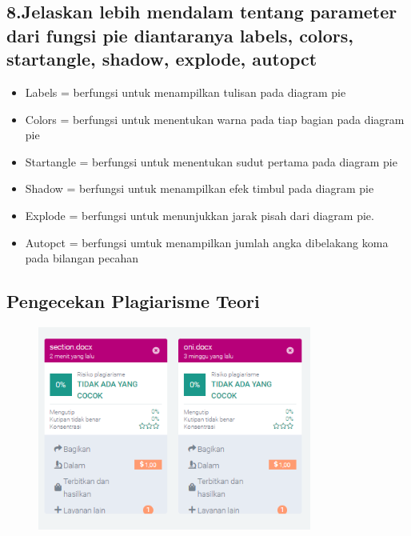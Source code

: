 \subsection{8.Jelaskan lebih mendalam tentang parameter dari fungsi pie diantaranya labels, colors, startangle, shadow, explode, autopct}
\begin{itemize}
\item Labels = berfungsi untuk menampilkan tulisan pada diagram pie
\item Colors = berfungsi untuk menentukan warna pada tiap bagian pada diagram pie
\item Startangle = berfungsi untuk menentukan sudut pertama pada diagram pie
\item Shadow = berfungsi untuk menampilkan efek timbul pada diagram pie
\item Explode = berfungsi untuk menunjukkan jarak pisah dari diagram pie.
\item Autopct = berfungsi umtuk menampilkan jumlah angka dibelakang koma pada bilangan pecahan
\end{itemize}

\subsection{Pengecekan Plagiarisme Teori}
\begin{figure}[H]
\includegraphics[width=9cm]{figures/6/Teori/1174005/Plagiat.png}
\centering
\end{figure}
